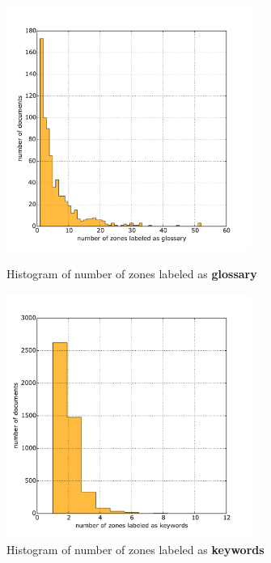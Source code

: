 \begin{figure}
\centering
\begin{minipage}[t!]{0.48\linewidth}
  \includegraphics[width=8cm]{plots/glossary_histogram}
  \caption{Histogram of number of zones labeled as \textbf{glossary}}
  \label{fig:glossary_histogram}
\end{minipage}
\quad
\begin{minipage}[t!]{0.48\linewidth}
  \includegraphics[width=8cm]{plots/keywords_histogram}
  \caption{Histogram of number of zones labeled as \textbf{keywords}}
  \label{fig:keywords_histogram}
\end{minipage}
\end{figure}

